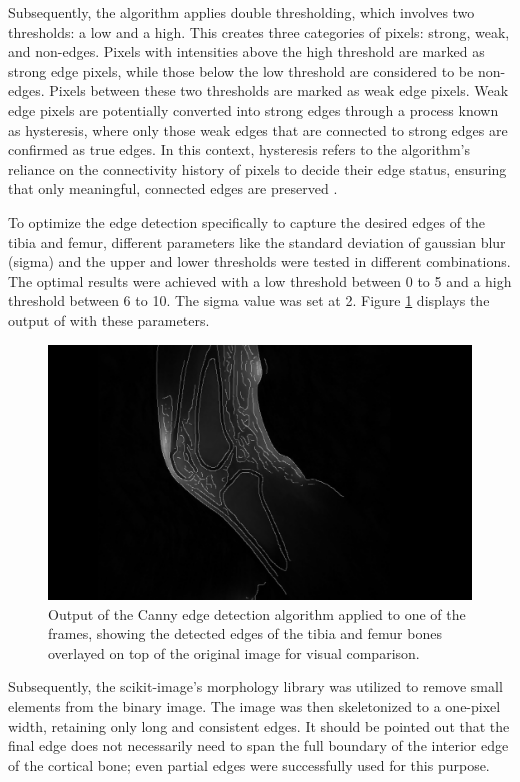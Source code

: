 \documentclass{micro-econ-thesis}
\begin{document}
Subsequently, the algorithm applies double thresholding, which involves two thresholds: a low and a high. This creates three categories of pixels: strong, weak, and non-edges. Pixels with intensities above the high threshold are marked as strong edge pixels, while those below the low threshold are considered to be non-edges. Pixels between these two thresholds are marked as weak edge pixels. Weak edge pixels are potentially converted into strong edges through a process known as hysteresis, where only those weak edges that are connected to strong edges are confirmed as true edges. In this context, hysteresis refers to the algorithm's reliance on the connectivity history of pixels to decide their edge status, ensuring that only meaningful, connected edges are preserved \parencite{heath_robust_1997}.  

To optimize the edge detection specifically to capture the desired edges of the tibia and femur, different parameters like the standard deviation of gaussian blur (sigma) and the upper and lower thresholds were tested in different combinations. The optimal results were achieved with a low threshold between 0 to 5 and a high threshold between 6 to 10. The sigma value was set at 2. Figure \ref{fig:edgemitimg} displays the output of with these parameters.  
\begin{figure}[H]
	\centering
	\includegraphics[width=0.7\linewidth]{edge_new}
	\caption{Output of the Canny edge detection algorithm applied to one of the frames, showing the detected edges of the tibia and femur bones overlayed on top of the original image for visual comparison.}
	\label{fig:edgemitimg}
\end{figure}


Subsequently, the scikit-image's morphology library was utilized to remove small elements from the binary image. The image was then skeletonized to a one-pixel width, retaining only long and consistent edges. It should be pointed out that the final edge does not necessarily need to span the full boundary of the interior edge of the cortical bone; even partial edges were successfully used for this purpose.  
\end{document}
